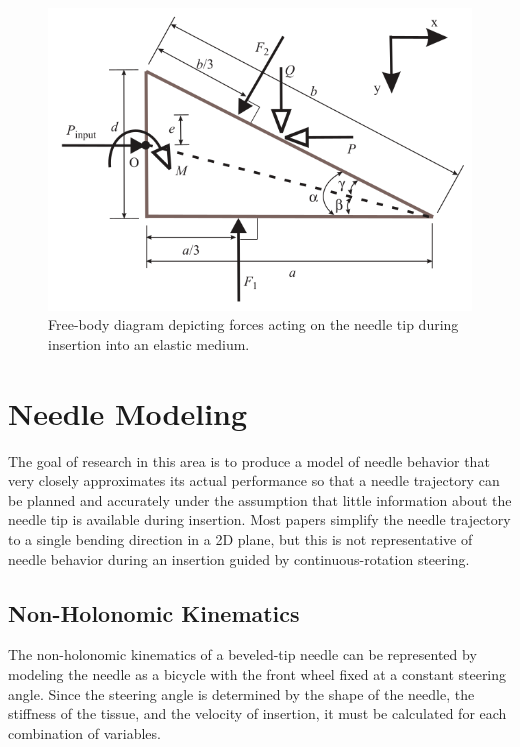 \begin{figure}[h]
\includegraphics[width=1.0\textwidth]{Fig/chap2/misra_tip_forces.png}
\caption{Free-body diagram depicting forces acting on the needle tip during insertion into an elastic medium\cite{misra_mechanics_2010}.}
\label{fig:tip_forces}
\end{figure}

\section{Needle Modeling}
The goal of research in this area is to produce a model of needle behavior that very closely approximates its actual performance so that a needle trajectory can be planned and accurately under the assumption that little information about the needle tip is available during insertion. Most papers simplify the needle trajectory to a single bending direction in a 2D plane, but this is not representative of needle behavior during an insertion guided by continuous-rotation steering.

\subsection{Non-Holonomic Kinematics}
The non-holonomic kinematics of a beveled-tip needle can be represented by modeling the needle as a bicycle with the front wheel fixed at a constant steering angle\cite{webster_nonholonomic_2006,cowan_robotic_2011}. Since the steering angle is determined by the shape of the needle, the stiffness of the tissue, and the velocity of insertion, it must be calculated for each combination of variables.

